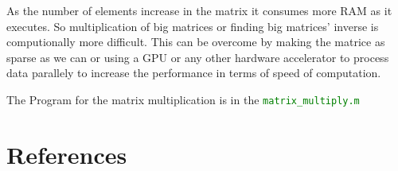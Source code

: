 \documentclass[fleqn,letterpaper,12pt]{report}
\begin{document}
As the number of elements increase in the matrix it consumes more RAM as it executes. So multiplication of big matrices or finding big matrices' inverse is computionally more difficult. This can be overcome by making the matrice as sparse as we can or using a GPU or any other hardware accelerator to process data parallely to increase the performance in terms of speed of computation. 

The Program for the matrix multiplication is in the {\tt{\textcolor{Green}{matrix\_multiply.m}}}
\newpage
{}
\section*{References}


\end{document}
